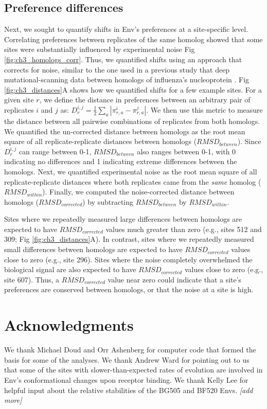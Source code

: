 \documentclass[9pt]{elife}
\newcommand{\jdbcomment}[1]{\emph{\color{red} [#1]}}
\begin{document}
\subsection{Preference differences}Next, we sought to quantify shifts in Env's preferences at a site-specific level.
Correlating preferences between replicates of the same homolog showed that some sites were substantially influenced by experimental noise Fig \ref{fig:ch3_homologs_corr}.
Thus, we quantified shifts using an approach that corrects for noise, similar to the one used in a previous study that deep mutational-scanning data between homologs of influenza's nucleoprotein \cite{doud2015site}.
Fig \ref{fig:ch3_distances}A shows how we quantified shifts for a few example sites.
For a given site $r$, we define the distance in preferences between an arbitrary pair of replicates $i$ and $j$ as: $D_{r}^{i,j} = \frac{1}{2}\sum_{a}|\pi_{r,a}^{i}-\pi_{r,a}^{j}|$.
We then use this metric to measure the distance between all pairwise combinations of replicates from both homologs.
We quantified the un-corrected distance between homologs as the root mean square of all replicate-replicate distances between homologs ($RMSD_{between}$).
Since $D_{r}^{i,j}$ can range between 0-1, $RMSD_{between}$ also ranges between 0-1, with 0 indicating no differences and 1 indicating extreme differences between the homologs.
Next, we quantified experimental noise as the root mean square of all replicate-replicate distances where both replicates came from the \textit{same} homolog ($RMSD_{within}$).
Finally, we computed the noise-corrected distance between homologs ($RMSD_{corrected}$) by subtracting $RMSD_{between}$ by $RMSD_{within}$.

Sites where we repeatedly measured large differences between homologs are expected to have $RMSD_{corrected}$ values much greater than zero (e.g., sites 512 and 309; Fig \ref{fig:ch3_distances}A).
In contrast, sites where we repeatedly measured small differences between homologs are expected to have $RMSD_{corrected}$ values close to zero (e.g., site 296).
Sites where the noise completely overwhelmed the biological signal are also expected to have $RMSD_{corrected}$ values close to zero (e.g., site 607).
Thus, a $RMSD_{corrected}$ value near zero could indicate that a site's preferences are conserved between homologs, or that the noise at a site is high.



\section{Acknowledgments}
We thank Michael Doud and Orr Ashenberg for computer code that formed the basis for some of the analyses.
We thank Andrew Ward for pointing out to us that some of the sites with slower-than-expected rates of evolution are involved in Env's conformational changes upon receptor binding.
We thank Kelly Lee for helpful input about the relative stabilities of the BG505 and BF520 Envs.
\jdbcomment{add more}
\end{document}
